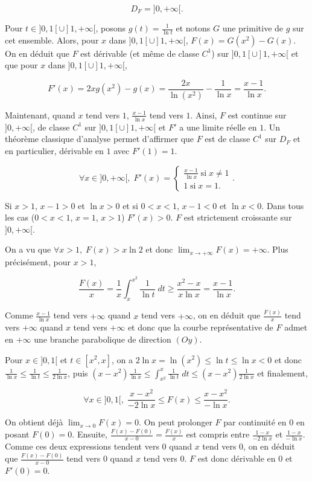 {{$$D_F=]0,+\infty[.$$

Pour $t\in]0,1[\cup]1,+\infty[$, posons $g(t)=\frac{1}{\ln t}$ et notons $G$ une primitive de $g$ sur cet ensemble. Alors, pour $x$ dans $]0,1[\cup]1,+\infty[$, $F(x)=G(x^2)-G(x)$. On en déduit que $F$ est dérivable (et même de classe $C^1$) sur $]0,1[\cup]1,+\infty[$ et que pour $x$ dans $]0,1[\cup]1,+\infty[$,

$$F'(x)=2xg(x^2)-g(x)=\frac{2x}{\ln(x^2)}-\frac{1}{\ln x}=\frac{x-1}{\ln x}.$$

Maintenant, quand $x$ tend vers $1$, $\frac{x-1}{\ln x}$ tend vers $1$. Ainsi, $F$ est continue sur $]0,+\infty[$, de classe $C^1$ sur $]0,1[\cup]1,+\infty[$ et $F'$ a une limite réelle en $1$. Un théorème classique d'analyse permet d'affirmer que  $F$ est de classe $C^1$ sur $D_F$ et en particulier, dérivable en $1$ avec $F'(1)=1$.

$$\forall x\in]0,+\infty[,\;F'(x)=\left\{
\begin{array}{l}
\frac{x-1}{\ln x}\;\mbox{si}\;x\neq1\\
1\;\mbox{si}\;x=1.
\end{array}
\right..$$

Si $x>1$, $x-1>0$ et $\ln x>0$ et si $0<x<1$, $x-1<0$ et $\ln x<0$. Dans tous les cas ($0<x<1$, $x=1$, $x>1$)  $F'(x)>0$. $F$ est strictement croissante sur $]0,+\infty[$.

On a vu que $\forall x>1,\;F(x)>x\ln2$ et donc $\lim_{x\rightarrow +\infty}F(x)=+\infty$. Plus précisément, pour $x>1$,

$$\frac{F(x)}{x}=\frac{1}{x}\int_{x}^{x^2}\frac{1}{\ln t}\;dt\geq\frac{x^2-x}{x\ln x}=\frac{x-1}{\ln x}.$$

Comme $\frac{x-1}{\ln x}$ tend vers $+\infty$ quand $x$ tend vers $+\infty$, on en déduit que $\frac{F(x)}{x}$ tend vers $+\infty$ quand $x$ tend vers $+\infty$ et donc que la courbe représentative de $F$ admet en $+\infty$ une branche parabolique de direction $(Oy)$.

Pour $x\in]0,1[$ et $t\in[x^2,x]$, on a $2\ln x=\ln(x^2)\leq\ln t\leq\ln x<0$ et donc $\frac{1}{\ln x}\leq\frac{1}{\ln t}\leq\frac{1}{2\ln x}$, puis $(x-x^2)\frac{1}{\ln x}\leq\int_{x^2}^{x}\frac{1}{\ln t}\;dt\leq(x-x^2)\frac{1}{2\ln x}$ et finalement,

$$\forall x\in]0,1[,\;\frac{x-x^2}{-2\ln x}\leq F(x)\leq\frac{x-x^2}{-\ln x}.$$

On obtient déjà $\lim_{x\rightarrow 0}F(x)=0$. On peut prolonger $F$ par continuité en $0$ en posant $F(0)=0$. Ensuite, $\frac{F(x)-F(0)}{x-0}=\frac{F(x)}{x}$ est compris entre $\frac{1-x}{-2\ln x}$ et $\frac{1-x}{-\ln x}$. Comme ces deux expressions tendent vers $0$ quand $x$ tend vers $0$, on en déduit que $\frac{F(x)-F(0)}{x-0}$ tend vers $0$ quand $x$ tend vers $0$. $F$ est donc dérivable en $0$ et $F'(0)=0$.

}}
